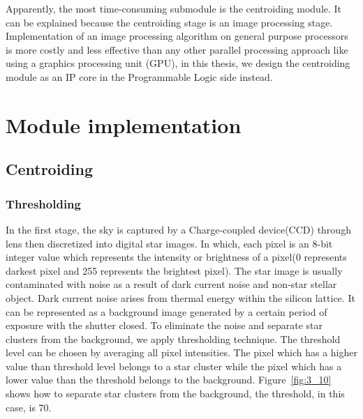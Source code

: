 \noindent Apparently, the most time-consuming submodule is the centroiding module. It can be explained because the centroiding stage is an image processing stage. Implementation of an image processing algorithm on general purpose processors is more costly and less effective than any other parallel processing approach like using a graphics processing unit (GPU), in this thesis, we design the centroiding module as an IP core in the Programmable Logic side instead.

\section{Module implementation}

\subsection{Centroiding}

\subsubsection{Thresholding}

In the first stage, the sky is captured by a Charge-coupled device(CCD) through lens then discretized into digital star images. In which, each pixel is an 8-bit integer value which represents the intensity or brightness of a pixel(0 represents darkest pixel and 255 represents the brightest pixel). The star image is usually contaminated with noise as a result of dark current noise and non-star stellar object. Dark current noise arises from thermal energy within the silicon lattice. It can be represented as a background image generated by a certain period of exposure with the shutter closed\cite{MDP}. To eliminate the noise and separate star clusters from the background, we apply thresholding technique. The threshold level can be chosen by averaging all pixel intensities. The pixel which has a higher value than threshold level belongs to a star cluster while the pixel which has a lower value than the threshold belongs to the background. Figure~\ref{fig:3_10} shows how to separate star clusters from the background, the threshold, in this case, is 70.



